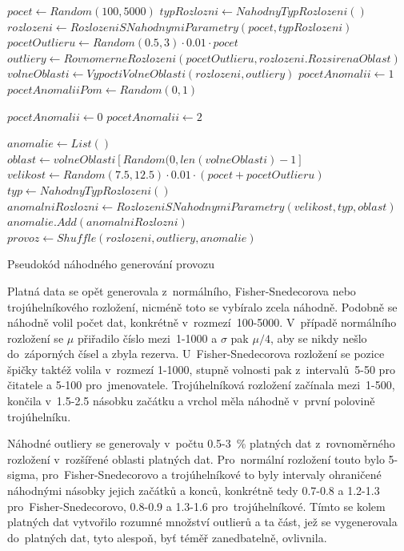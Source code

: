 \makeatletter
\renewcommand*{\ALG@name}{Algoritmus}
\makeatother
\begin{algorithm}
    \begin{algorithmic}[1]
    \STATE $pocet\gets Random(100, 5000)$
    \STATE $typRozlozni\gets NahodnyTypRozlozeni()$
    \STATE $rozlozeni\gets RozlozeniSNahodnymiParametry(pocet, typRozlozeni)$
    \STATE $pocetOutlieru\gets Random(0.5, 3)\cdot0.01\cdot pocet$
    \STATE $outliery\gets RovnomerneRozlozeni(pocetOutlieru, rozlozeni.RozsirenaOblast)$
    \STATE $volneOblasti\gets VypoctiVolneOblasti(rozlozeni, outliery)$
    \STATE $pocetAnomalii\gets 1$
    \STATE $pocetAnomaliiPom\gets Random(0, 1)$
    
        \STATE $pocetAnomalii\gets 0$
        \STATE $pocetAnomalii\gets 2$
     \ENDIF
    
    \STATE $anomalie\gets List()$
        \STATE $oblast\gets volneOblasti[Random(0, len(volneOblasti)-1]$
        \STATE $velikost\gets Random(7.5, 12.5)\cdot0.01\cdot(pocet + pocetOutlieru)$
        \STATE $typ\gets NahodnyTypRozlozeni()$
        \STATE $anomalniRozlozni\gets RozlozeniSNahodnymiParametry(velikost, typ, oblast)$
        \STATE $anomalie.Add(anomalniRozlozni)$
    \ENDFOR
    \STATE $provoz\gets Shuffle(rozlozeni, outliery, anomalie)$
    \end{algorithmic}
    \caption{Pseudokód náhodného generování provozu}
    \label{pseudokod-generovani-provozu}
\end{algorithm}

Platná data se opět generovala z~normálního, Fisher-Snedecorova nebo trojúhelníkového rozložení, nicméně toto se vybíralo zcela náhodně. Podobně se náhodně volil počet dat, konkrétně v~rozmezí~100-5000. V~případě normálního rozložení se \(\mu\) přiřadilo číslo mezi~1-1000 a \(\sigma\) pak \(\mu / 4\), aby se nikdy nešlo do~záporných čísel a zbyla rezerva. U~Fisher-Snedecorova rozložení se pozice špičky taktéž volila v~rozmezí 1-1000, stupně volnosti pak z~intervalů~5-50 pro čitatele a 5-100 pro~jmenovatele. Trojúhelníková rozložení začínala mezi~1-500, končila v~1.5-2.5 násobku začátku a vrchol měla náhodně v~první polovině trojúhelníku.

Náhodné outliery se generovaly v~počtu 0.5-3~\% platných dat z~rovnoměrného rozložení v~rozšířené oblasti platných dat. Pro~normální rozložení touto bylo 5-sigma, pro~Fisher-Snedecorovo a trojúhelníkové to byly intervaly ohraničené náhodnými násobky jejich začátků a konců, konkrétně tedy 0.7-0.8 a 1.2-1.3 pro~Fisher-Snedecorovo, 0.8-0.9 a 1.3-1.6 pro~trojúhelníkové. Tímto se kolem platných dat vytvořilo rozumné množství outlierů a ta část, jež se vygenerovala do~platných dat, tyto alespoň, byť téměř zanedbatelně, ovlivnila.

